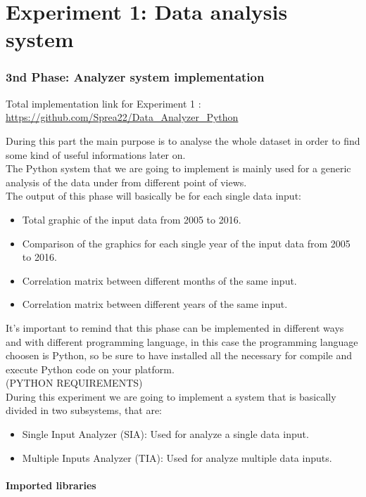 \part{Experiment 1: Data analysis system}
\section{3nd Phase: Analyzer system implementation}
Total implementation link for Experiment 1 : \\
\url{https://github.com/Sprea22/Data_Analyzer_Python}

During this part the main purpose is to analyse the whole dataset in order to find some kind of useful informations later on. \\
The Python system that we are going to implement is mainly used for a generic analysis of the data under from different point of views.\\
The output of this phase will basically be for each single data input:
\begin{itemize}
\item Total graphic of the input data from 2005 to 2016.
\item Comparison of the graphics for each single year of the input data from 2005 to 2016.
\item Correlation matrix between different months of the same input.
\item Correlation matrix between different years of the same input.
\end{itemize}


It's important to remind that this phase can be implemented in different ways and with different programming language, in this case the programming language choosen is Python, so be sure to have installed all the necessary for compile and execute Python code on your platform.\\
(PYTHON REQUIREMENTS)\\
During this experiment we are going to implement a system that is basically divided in two subsystems, that are:
\begin{itemize}
\item Single Input Analyzer (SIA): Used for analyze a single data input.
\item Multiple Inputs Analyzer (TIA): Used for analyze multiple data inputs.
\end{itemize}
\newpage
\subsection{Imported libraries}

